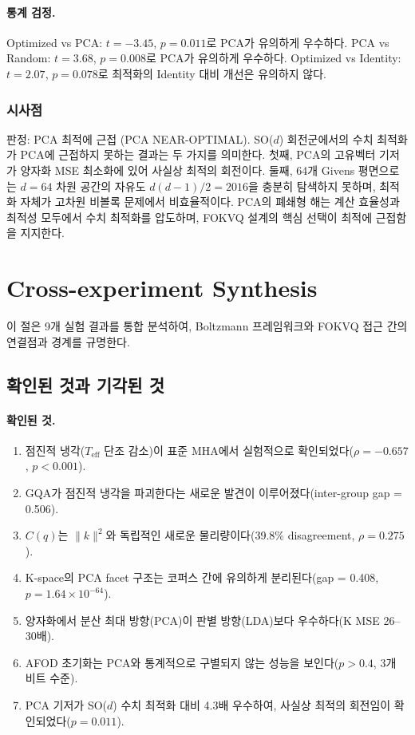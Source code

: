 \documentclass[11pt,a4paper]{article}
\begin{document}
\paragraph{통계 검정.}
Optimized vs PCA: $t = -3.45$, $p = 0.011$로 PCA가 유의하게 우수하다.
PCA vs Random: $t = 3.68$, $p = 0.008$로 PCA가 유의하게 우수하다.
Optimized vs Identity: $t = 2.07$, $p = 0.078$로 최적화의 Identity 대비 개선은 유의하지 않다.

\subsubsection{시사점}

판정: \textcolor{success}{PCA 최적에 근접 (PCA NEAR-OPTIMAL)}.
SO($d$) 회전군에서의 수치 최적화가 PCA에 근접하지 못하는 결과는 두 가지를 의미한다.
첫째, PCA의 고유벡터 기저가 양자화 MSE 최소화에 있어 사실상 최적의 회전이다.
둘째, 64개 Givens 평면으로는 $d=64$ 차원 공간의 자유도 $d(d-1)/2 = 2016$을 충분히 탐색하지 못하며, 최적화 자체가 고차원 비볼록 문제에서 비효율적이다.
PCA의 폐쇄형 해는 계산 효율성과 최적성 모두에서 수치 최적화를 압도하며, FOKVQ 설계의 핵심 선택이 최적에 근접함을 지지한다.

\newpage
\section{Cross-experiment Synthesis}

이 절은 9개 실험 결과를 통합 분석하여, Boltzmann 프레임워크와 FOKVQ 접근 간의 연결점과 경계를 규명한다.

\subsection{확인된 것과 기각된 것}

\paragraph{확인된 것.}
\begin{enumerate}[nosep]
  \item 점진적 냉각($T_\mathrm{eff}$ 단조 감소)이 표준 MHA에서 실험적으로 확인되었다($\rho = -0.657$, $p < 0.001$).
  \item GQA가 점진적 냉각을 파괴한다는 새로운 발견이 이루어졌다(inter-group gap = 0.506).
  \item $C(q)$는 $\|k\|^2$와 독립적인 새로운 물리량이다(39.8\% disagreement, $\rho = 0.275$).
  \item K-space의 PCA facet 구조는 코퍼스 간에 유의하게 분리된다(gap = 0.408, $p = 1.64 \times 10^{-64}$).
  \item 양자화에서 분산 최대 방향(PCA)이 판별 방향(LDA)보다 우수하다(K MSE 26--30배).
  \item AFOD 초기화는 PCA와 통계적으로 구별되지 않는 성능을 보인다($p > 0.4$, 3개 비트 수준).
  \item PCA 기저가 SO($d$) 수치 최적화 대비 4.3배 우수하여, 사실상 최적의 회전임이 확인되었다($p = 0.011$).
\end{enumerate}
\end{document}
